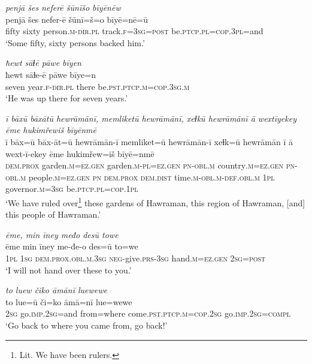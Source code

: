 \ea \label{DP.8}
\textit{penjā šes neferē šūnīšo bīyēnēw} \\ 
\gll penjā šes nefer-ē šūnī=š=o bīyē=nē=ū \\ 
 fifty sixty person\textsc{.m}\textsc{-dir}\textsc{.pl} track\textsc{\textsc{.f}}\textsc{=3sg}\textsc{=\textsc{post}} be\textsc{.ptcp}\textsc{.pl}\textsc{=cop}\textsc{.3pl}=and \\ 
\glt `Some fifty, sixty persons backed him.'
\z 
 
\ea \label{DP.11}
\textit{ħewt sāɫē pāwe bīyen} \\ 
\gll ħewt sāɫe-ē pāwe bīye=n \\ 
 seven year\textsc{\textsc{.f}}\textsc{-dir}\textsc{.pl} there be\textsc{.pst}\textsc{.ptcp}\textsc{.m}\textsc{=cop}\textsc{.3sg}\textsc{.m} \\ 
\glt `He was up there for seven years.'
\z 
 
\ea \label{DP.21}
\textit{ī bāxū bāxātū hewrāmānī, memliketū hewrāmānī, xeɫkū hewrāmānī ā wextīyekey ēme hukimřewiš bīyēnmē} \\ 
\gll ī bāx=ū bāx-āt=ū hewrāmān-ī memliket=ū hewrāmān-ī xeɫk=ū hewrāmān ī ā wext-ī-ekey ēme hukimřew=iš bīyē=nmē \\ 
 \textsc{dem.prox} garden\textsc{.m}\textsc{=ez}\textsc{.gen} garden\textsc{.m}\textsc{-pl}\textsc{=ez}\textsc{.gen} \textsc{pn}\textsc{-obl}\textsc{.m} country\textsc{.m}\textsc{=ez}\textsc{.gen} \textsc{pn}\textsc{-obl}\textsc{.m} people\textsc{.m}\textsc{=ez}\textsc{.gen} \textsc{pn} \textsc{dem.prox} \textsc{dem.dist} time\textsc{.m}\textsc{-obl}\textsc{.m}\textsc{-def}\textsc{.obl}\textsc{.m} \textsc{1pl} governor\textsc{.m}\textsc{=3sg} be\textsc{.ptcp}\textsc{.pl}\textsc{=cop}\textsc{.1pl} \\ 
\glt `We have ruled over\footnote{Lit. We have been rulers.} these gardens of Hawraman, this region of Hawraman, [and] this people of Hawraman.'
\z 
 
\ea \label{DP.22}
\textit{ēme, min īney međo desū towe} \\ 
\gll ēme min īney me-đe-o des=ū to=we \\ 
 \textsc{1pl} \textsc{1sg} \textsc{dem.prox}\textsc{.obl}\textsc{.m}\textsc{.3sg} \textsc{neg-}give\textsc{.prs}\textsc{-3sg} hand\textsc{.m}\textsc{=ez}\textsc{.gen} \textsc{2sg}\textsc{=\textsc{post}} \\ 
\glt `I will not hand over these to you.'
\z 
 
\ea \label{DP.24}
\textit{to luew čiko āmānī luewewe} \\ 
\gll to lue=ū či=ko āmā=nī lue=wewe \\ 
 \textsc{2sg} go\textsc{.imp}\textsc{.\textsc{2sg}}=and from=where come\textsc{.pst}\textsc{.ptcp}\textsc{.m}\textsc{=cop}\textsc{.\textsc{2sg}} go\textsc{.imp}\textsc{.\textsc{2sg}}\textsc{=compl} \\ 
\glt `Go back to where you came from, go back!'
\z 
 
